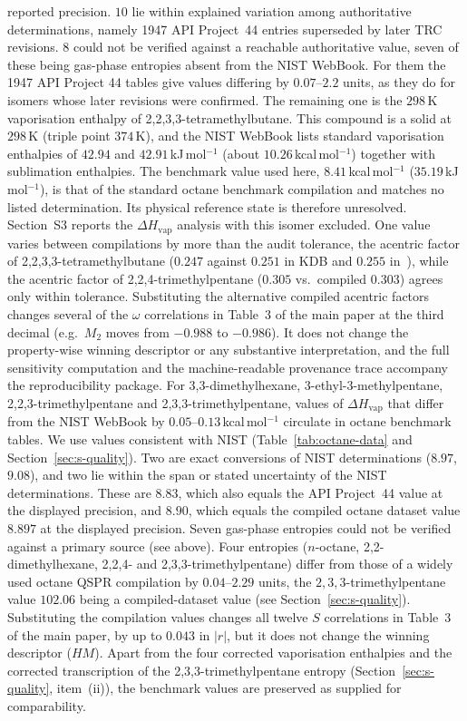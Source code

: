 \documentclass[a5paper, 10pt]{article}
\theoremstyle{plain}
\theoremstyle{remark}
\theoremstyle{definition}
\begin{document}
reported precision. $10$ lie within explained variation among
authoritative determinations, namely 1947 API Project~44 entries
superseded by later TRC revisions. $8$ could not be verified against a
reachable authoritative value, seven of these being gas-phase entropies
absent from the NIST WebBook. For them the 1947 API Project 44 tables
give values differing by $0.07$--$2.2$ units, as they do for isomers
whose later revisions were confirmed. The remaining one is the
$298$\,K vaporisation enthalpy of 2,2,3,3-tetramethylbutane. This
compound is a solid at $298$\,K (triple point $374$\,K), and the NIST
WebBook lists standard vaporisation enthalpies of $42.94$ and
$42.91$\,kJ\,mol$^{-1}$ (about $10.26$\,kcal\,mol$^{-1}$) together with
sublimation enthalpies. The benchmark value used here,
$8.41$\,kcal\,mol$^{-1}$ ($35.19$\,kJ\,mol$^{-1}$), is that of the
standard octane benchmark compilation and matches no listed
determination. Its physical reference state is therefore unresolved.
Section~S3 reports the $\Delta H_{\mathrm{vap}}$ analysis with this
isomer excluded. One value varies between compilations by more than the audit tolerance, the acentric factor of 2,2,3,3-tetramethylbutane ($0.247$ against $0.251$ in KDB and $0.255$ in~\cite{Ediz2017Octane}), while the
acentric factor of 2,2,4-trimethylpentane ($0.305$ vs.\ compiled
$0.303$) agrees only within tolerance. Substituting the alternative
compiled acentric factors changes several of the $\omega$ correlations
in Table~3 of the main paper at the third decimal (e.g.\ $M_2$ moves
from $-0.988$ to $-0.986$). It does not change the property-wise winning
descriptor or any substantive interpretation, and the full sensitivity
computation and the machine-readable provenance trace accompany the
reproducibility package. For 3,3-dimethylhexane,
3-ethyl-3-methylpentane, 2,2,3-trimethylpentane and
2,3,3-trimethylpentane, values of $\Delta H_{\mathrm{vap}}$ that differ
from the NIST WebBook by $0.05$--$0.13$\,kcal\,mol$^{-1}$ circulate in
octane benchmark tables. We use values consistent with NIST
(Table~\ref{tab:octane-data} and Section~\ref{sec:s-quality}). Two are exact conversions of NIST
determinations ($8.97$, $9.08$), and two lie within the span or stated
uncertainty of the NIST determinations. These are $8.83$, which also
equals the API Project~44 value at the displayed precision, and $8.90$,
which equals the compiled octane dataset value $8.897$ at the displayed
precision. Seven gas-phase entropies could not be verified against a
primary source (see above). Four entropies ($n$-octane,
2,2-dimethylhexane, 2,2,4- and 2,3,3-trimethylpentane) differ from
those of a widely used octane QSPR compilation by $0.04$--$2.29$ units,
the $2,3,3$-trimethylpentane value $102.06$ being a compiled-dataset
value (see Section~\ref{sec:s-quality}). Substituting the compilation values
changes all twelve $S$ correlations in Table~3 of the main paper, by up
to $0.043$ in $|r|$, but it does not change the winning descriptor
($HM$). Apart from the four corrected vaporisation enthalpies and the
corrected transcription of the 2,3,3-trimethylpentane entropy
(Section~\ref{sec:s-quality}, item~(ii)), the benchmark values are
preserved as supplied for comparability.
\end{document}
